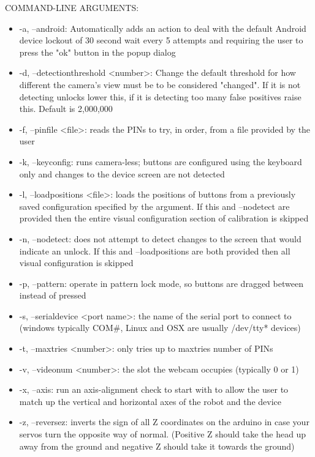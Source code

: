 \documentclass[a4paper,12pt]{letter}
\begin{document}
COMMAND-LINE ARGUMENTS:
\begin{itemize}
\item -a, --android: Automatically adds an action to deal with the default Android device lockout of 30 second wait every 5 attempts and requiring the user to press the "ok" button in the popup dialog
\item -d, --detectionthreshold <number>: Change the default threshold for how different the camera's view must be to be considered "changed". If it is not detecting unlocks lower this, if it is detecting too many false positives raise this. Default is 2,000,000
\item -f, --pinfile <file>: reads the PINs to try, in order, from a file provided by the user
\item -k, --keyconfig: runs camera-less; buttons are configured using the keyboard only and changes to the device screen are not detected
\item -l, --loadpositions <file>: loads the positions of buttons from a previously saved configuration specified by the argument. If this and --nodetect are provided then the entire visual configuration section of calibration is skipped
\item -n, --nodetect: does not attempt to detect changes to the screen that would indicate an unlock. If this and --loadpositions are both provided then all visual configuration is skipped
\item -p, --pattern: operate in pattern lock mode, so buttons are dragged between instead of pressed
\item -s, --serialdevice <port name>: the name of the serial port to connect to (windows typically COM\#, Linux and OSX are usually /dev/tty* devices) 
\item -t, --maxtries <number>: only tries up to maxtries number of PINs
\item -v, --videonum <number>: the slot the webcam occupies (typically 0 or 1)
\item -x, --axis: run an axis-alignment check to start with to allow the user to match up the vertical and horizontal axes of the robot and the device
\item -z, --reversez: inverts the sign of all Z coordinates on the arduino in case your servos turn the opposite way of normal. (Positive Z should take the head up away from the ground and negative Z should take it towards the ground)
\end{itemize}
\end{document}
